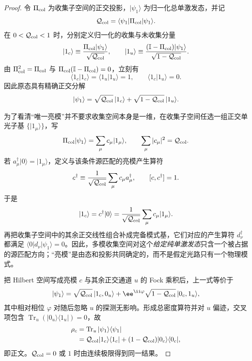 \begin{proof}
令 $\Pi_{\rm col}$ 为收集子空间的正交投影，$|\psi_1\rangle$ 为归一化总单激发态，并记
\[
\mathcal Q_{\rm col}
=\langle\psi_1|\Pi_{\rm col}|\psi_1\rangle.
\]
在 $0<\mathcal Q_{\rm col}<1$ 时，分别定义归一化的收集与未收集分量
\[
|1_c\rangle
\equiv
\frac{\Pi_{\rm col}|\psi_1\rangle}{\sqrt{\mathcal Q_{\rm col}}},
\qquad
|1_u\rangle
\equiv
\frac{(\mathbb I-\Pi_{\rm col})|\psi_1\rangle}
{\sqrt{1-\mathcal Q_{\rm col}}}.
\]
由 $\Pi_{\rm col}^2=\Pi_{\rm col}$ 与
$\Pi_{\rm col}(\mathbb I-\Pi_{\rm col})=0$，立刻有
\[
\langle1_c|1_c\rangle
=\langle1_u|1_u\rangle=1,
\qquad
\langle1_c|1_u\rangle=0.
\]
因此原态具有精确正交分解
\[
|\psi_1\rangle
=\sqrt{\mathcal Q_{\rm col}}\,|1_c\rangle
+\sqrt{1-\mathcal Q_{\rm col}}\,|1_u\rangle.
\]

为了看清“唯一亮模”并不要求收集空间本身是一维，在收集子空间任选一组正交单光子基
$\{|1_\mu\rangle\}$，写
\begin{equation*}
\Pi_{\rm col}|\psi_1\rangle
=\sum_\mu c_\mu|1_\mu\rangle,
\qquad
\sum_\mu|c_\mu|^2=\mathcal Q_{\rm col}.
\end{equation*}
若 $a_\mu^\dagger|0\rangle=|1_\mu\rangle$，定义与该条件源匹配的亮模产生算符
\begin{equation*}
 c^\dagger
 \equiv
 \frac{1}{\sqrt{\mathcal Q_{\rm col}}}
 \sum_\mu c_\mu a_\mu^\dagger,
 \qquad
 [c,c^\dagger]=1.
\end{equation*}
于是
\begin{equation*}
|1_c\rangle=c^\dagger|0\rangle
=\frac{1}{\sqrt{\mathcal Q_{\rm col}}}
\sum_\mu c_\mu|1_\mu\rangle.
\end{equation*}
再把收集子空间中的其余正交线性组合补成完备模式基，它们对应的产生算符 $d_\nu^\dagger$ 都满足
$\langle0|d_\nu|\psi_1\rangle=0$。因此，多模收集空间对这个\emph{给定纯单激发态}只含一个被占据的源匹配方向；“亮模”是由态和投影共同确定的，而不是假定光路只有一个物理模式。

把 Hilbert 空间写成亮模 $c$ 与其余正交通道 $u$ 的 Fock 乘积后，上一式等价于
\[
|\psi_1\rangle
=\sqrt{\mathcal Q_{\rm col}}\,|1_c,0_u\rangle
+\ee^{\ii\varphi}
\sqrt{1-\mathcal Q_{\rm col}}\,|0_c,1_u\rangle,
\]
其中相对相位 $\varphi$ 对随后忽略 $u$ 的探测无影响。形成总密度算符并对 $u$ 偏迹，交叉项包含
$\operatorname{Tr}_u(|0_u\rangle\langle1_u|)=0$，故
\begin{align*}
\rho_c
&=\operatorname{Tr}_u|\psi_1\rangle\langle\psi_1|\\
&=\mathcal Q_{\rm col}|1_c\rangle\langle1_c|
+(1-\mathcal Q_{\rm col})|0_c\rangle\langle0_c|,
\end{align*}
即正文。$\mathcal Q_{\rm col}=0$ 或 $1$ 时由连续极限得到同一结果。
\end{proof}

